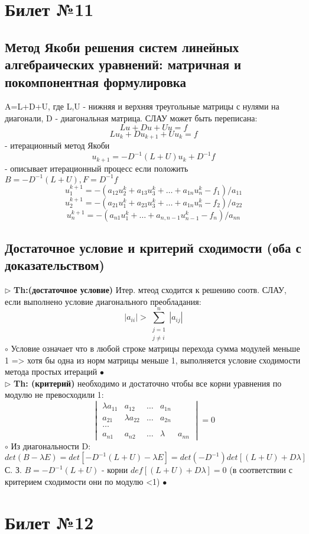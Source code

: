 \documentclass[a4paper]{article}
\begin{document}
\section{Билет №11}
\subsection{Метод Якоби решения систем линейных алгебраических уравнений: матричная и покомпонентная формулировка}
A=L+D+U, где L,U - нижняя и верхняя треугольные матрицы с нулями на диагонали, D - диагональная матрица. СЛАУ может быть переписана:
$$ Lu + Du + Uu = f$$
$$ Lu_k + Du_{k+1} + Uu_k =f$$ - итерационный метод Якоби
$$ u_{k+1} = -D^{-1}(L+U)u_k + D^{-1}f$$ - описывает итерационный процесс если положить $ B=-D^{-1}(L+U), F=D^{-1}f$
$$ u_1^{k+1}=-(a_{12}u_2^k + a_{13}u_3^k + \ldots + a_{1n}u_n^k - f_1)/a_{11}$$
$$ u_2^{k+1}=-(a_{21}u_1^k + a_{23}u_3^k + \ldots + a_{1n}u_n^k - f_2)/a_{22}$$
$$ u_n^{k+1}=-(a_{n1}u_1^k + \ldots + a_{n,n-1}u_{n-1}^k - f_n)/a_{nn} $$
\subsection{Достаточное условие и критерий сходимости (оба с доказательством)}
$\triangleright$ \textbf{Th:(достаточное условие)} Итер. мтеод сходится к решению соотв. СЛАУ, если выполнено условие диагонального преобладания:
$$ |a_{ii}| > \sum_{\substack{j=1 \\ j \neq i}}^n |a_{ij}|$$
	$\circ$ 
		Условие означает что в любой строке матрицы перехода сумма модулей меньше 1 => хотя бы одна из норм матрицы меньше 1, выполняется условие сходимости метода простых итераций 
	$\bullet$ \\

$\triangleright$ \textbf{Th: (критерий)} необходимо и достаточно чтобы все корни уравнения по модулю не превосходили 1:
$$ \begin{vmatrix} 
\lambda a_{11} & a_{12} & \ldots & a_{1n} \\
a_{21} & \lambda a_{22} & \ldots & a_{2n} \\
\ldots \\
a_{n1} & a_{n2} & \ldots & \lambda & a_{nn}
\end{vmatrix} = 0 $$
	$\circ$ 
		Из диагональности D:
		$$ det(B-\lambda E) = det[-D^{-1}(L+U) - \lambda E] = det(-D^{-1}) det[(L+U) + D\lambda] $$
		С. З. $B=-D^{-1}(L+U)$ - корни $def[(L+U)+D\lambda]=0$ (в соответствии с критерием сходимости они по модулю <1)
	$\bullet$

\section{Билет №12}
\end{document}
